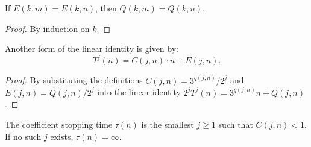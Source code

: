 \begin{lemma}\label{lemma:decomposition_correction_eq_of_E_vec_eq}\leanok
If $E(k, m) = E(k, n)$, then $Q(k, m) = Q(k, n)$.
\end{lemma}
\begin{proof}\leanok
By induction on $k$.
\end{proof}

\begin{lemma}\label{lemma:linear_decomposition'}\leanok
Another form of the linear identity is given by:
\begin{equation}
    T^j(n) = C(j, n) \cdot n + E(j, n).
\end{equation}
\end{lemma}
\begin{proof}\leanok
By substituting the definitions $C(j, n) = 3^{q(j, n)}/2^j$ and $E(j, n) = Q(j, n)/2^j$ into the
linear identity $2^j T^j(n) = 3^{q(j, n)} n + Q(j, n)$.
\end{proof}

\begin{definition}\label{def:coeff_stopping_time}\leanok
The coefficient stopping time $\tau(n)$ is the smallest $j \ge 1$ such that $C(j, n) < 1$.
If no such $j$ exists, $\tau(n) = \infty$.
\end{definition}
